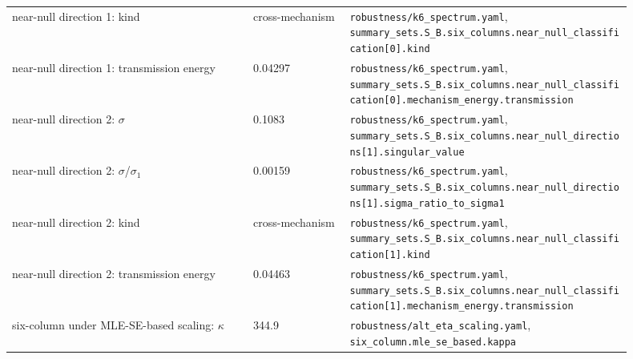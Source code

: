 \begin{longtable}{p{0.35\linewidth} p{0.14\linewidth} p{0.41\linewidth}}
near-null direction 1: kind & cross-mechanism & \texttt{\footnotesize robustness/k6\_\allowbreak{}spectrum.\allowbreak{}yaml}, \texttt{\footnotesize summary\_\allowbreak{}sets.\allowbreak{}S\_\allowbreak{}B.\allowbreak{}six\_\allowbreak{}columns.\allowbreak{}near\_\allowbreak{}null\_\allowbreak{}classification[0].\allowbreak{}kind} \\
near-null direction 1: transmission energy & 0.04297 & \texttt{\footnotesize robustness/k6\_\allowbreak{}spectrum.\allowbreak{}yaml}, \texttt{\footnotesize summary\_\allowbreak{}sets.\allowbreak{}S\_\allowbreak{}B.\allowbreak{}six\_\allowbreak{}columns.\allowbreak{}near\_\allowbreak{}null\_\allowbreak{}classification[0].\allowbreak{}mechanism\_\allowbreak{}energy.\allowbreak{}transmission} \\
near-null direction 2: $\sigma$ & 0.1083 & \texttt{\footnotesize robustness/k6\_\allowbreak{}spectrum.\allowbreak{}yaml}, \texttt{\footnotesize summary\_\allowbreak{}sets.\allowbreak{}S\_\allowbreak{}B.\allowbreak{}six\_\allowbreak{}columns.\allowbreak{}near\_\allowbreak{}null\_\allowbreak{}directions[1].\allowbreak{}singular\_\allowbreak{}value} \\
near-null direction 2: $\sigma$/$\sigma_1$ & 0.00159 & \texttt{\footnotesize robustness/k6\_\allowbreak{}spectrum.\allowbreak{}yaml}, \texttt{\footnotesize summary\_\allowbreak{}sets.\allowbreak{}S\_\allowbreak{}B.\allowbreak{}six\_\allowbreak{}columns.\allowbreak{}near\_\allowbreak{}null\_\allowbreak{}directions[1].\allowbreak{}sigma\_\allowbreak{}ratio\_\allowbreak{}to\_\allowbreak{}sigma1} \\
near-null direction 2: kind & cross-mechanism & \texttt{\footnotesize robustness/k6\_\allowbreak{}spectrum.\allowbreak{}yaml}, \texttt{\footnotesize summary\_\allowbreak{}sets.\allowbreak{}S\_\allowbreak{}B.\allowbreak{}six\_\allowbreak{}columns.\allowbreak{}near\_\allowbreak{}null\_\allowbreak{}classification[1].\allowbreak{}kind} \\
near-null direction 2: transmission energy & 0.04463 & \texttt{\footnotesize robustness/k6\_\allowbreak{}spectrum.\allowbreak{}yaml}, \texttt{\footnotesize summary\_\allowbreak{}sets.\allowbreak{}S\_\allowbreak{}B.\allowbreak{}six\_\allowbreak{}columns.\allowbreak{}near\_\allowbreak{}null\_\allowbreak{}classification[1].\allowbreak{}mechanism\_\allowbreak{}energy.\allowbreak{}transmission} \\
six-column under MLE-SE-based scaling: $\kappa$ & 344.9 & \texttt{\footnotesize robustness/alt\_\allowbreak{}eta\_\allowbreak{}scaling.\allowbreak{}yaml}, \texttt{\footnotesize six\_\allowbreak{}column.\allowbreak{}mle\_\allowbreak{}se\_\allowbreak{}based.\allowbreak{}kappa} \\

\end{longtable}
